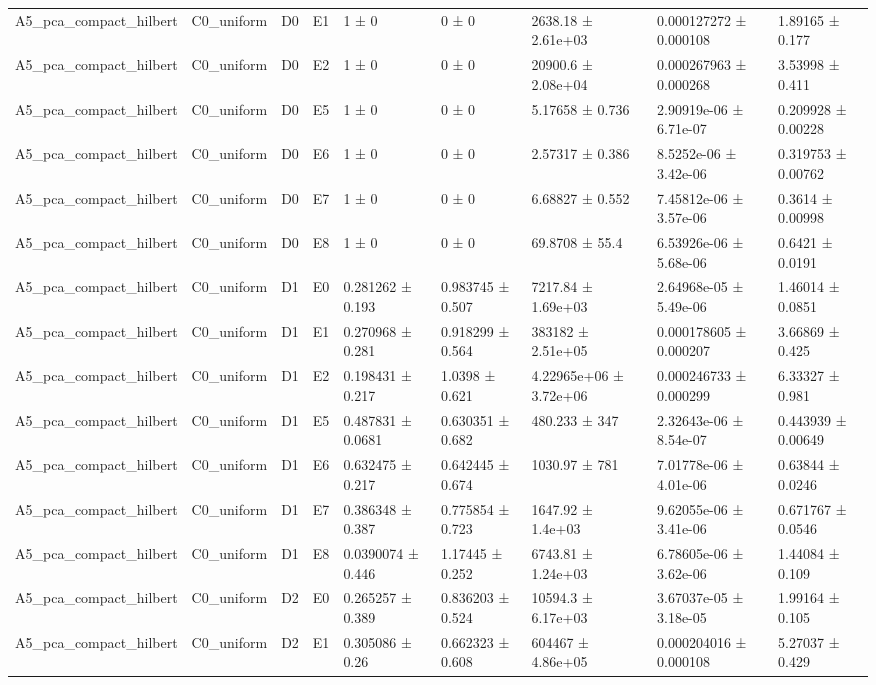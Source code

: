 \begin{table}
\begin{tabular}{lllllllll}
A5\_pca\_compact\_hilbert & C0\_uniform & D0 & E1 & 1 ± 0 & 0 ± 0 & 2638.18 ± 2.61e+03 & 0.000127272 ± 0.000108 & 1.89165 ± 0.177 \\
A5\_pca\_compact\_hilbert & C0\_uniform & D0 & E2 & 1 ± 0 & 0 ± 0 & 20900.6 ± 2.08e+04 & 0.000267963 ± 0.000268 & 3.53998 ± 0.411 \\
A5\_pca\_compact\_hilbert & C0\_uniform & D0 & E5 & 1 ± 0 & 0 ± 0 & 5.17658 ± 0.736 & 2.90919e-06 ± 6.71e-07 & 0.209928 ± 0.00228 \\
A5\_pca\_compact\_hilbert & C0\_uniform & D0 & E6 & 1 ± 0 & 0 ± 0 & 2.57317 ± 0.386 & 8.5252e-06 ± 3.42e-06 & 0.319753 ± 0.00762 \\
A5\_pca\_compact\_hilbert & C0\_uniform & D0 & E7 & 1 ± 0 & 0 ± 0 & 6.68827 ± 0.552 & 7.45812e-06 ± 3.57e-06 & 0.3614 ± 0.00998 \\
A5\_pca\_compact\_hilbert & C0\_uniform & D0 & E8 & 1 ± 0 & 0 ± 0 & 69.8708 ± 55.4 & 6.53926e-06 ± 5.68e-06 & 0.6421 ± 0.0191 \\
A5\_pca\_compact\_hilbert & C0\_uniform & D1 & E0 & 0.281262 ± 0.193 & 0.983745 ± 0.507 & 7217.84 ± 1.69e+03 & 2.64968e-05 ± 5.49e-06 & 1.46014 ± 0.0851 \\
A5\_pca\_compact\_hilbert & C0\_uniform & D1 & E1 & 0.270968 ± 0.281 & 0.918299 ± 0.564 & 383182 ± 2.51e+05 & 0.000178605 ± 0.000207 & 3.66869 ± 0.425 \\
A5\_pca\_compact\_hilbert & C0\_uniform & D1 & E2 & 0.198431 ± 0.217 & 1.0398 ± 0.621 & 4.22965e+06 ± 3.72e+06 & 0.000246733 ± 0.000299 & 6.33327 ± 0.981 \\
A5\_pca\_compact\_hilbert & C0\_uniform & D1 & E5 & 0.487831 ± 0.0681 & 0.630351 ± 0.682 & 480.233 ± 347 & 2.32643e-06 ± 8.54e-07 & 0.443939 ± 0.00649 \\
A5\_pca\_compact\_hilbert & C0\_uniform & D1 & E6 & 0.632475 ± 0.217 & 0.642445 ± 0.674 & 1030.97 ± 781 & 7.01778e-06 ± 4.01e-06 & 0.63844 ± 0.0246 \\
A5\_pca\_compact\_hilbert & C0\_uniform & D1 & E7 & 0.386348 ± 0.387 & 0.775854 ± 0.723 & 1647.92 ± 1.4e+03 & 9.62055e-06 ± 3.41e-06 & 0.671767 ± 0.0546 \\
A5\_pca\_compact\_hilbert & C0\_uniform & D1 & E8 & 0.0390074 ± 0.446 & 1.17445 ± 0.252 & 6743.81 ± 1.24e+03 & 6.78605e-06 ± 3.62e-06 & 1.44084 ± 0.109 \\
A5\_pca\_compact\_hilbert & C0\_uniform & D2 & E0 & 0.265257 ± 0.389 & 0.836203 ± 0.524 & 10594.3 ± 6.17e+03 & 3.67037e-05 ± 3.18e-05 & 1.99164 ± 0.105 \\
A5\_pca\_compact\_hilbert & C0\_uniform & D2 & E1 & 0.305086 ± 0.26 & 0.662323 ± 0.608 & 604467 ± 4.86e+05 & 0.000204016 ± 0.000108 & 5.27037 ± 0.429 \\

\end{tabular}
\end{table}
